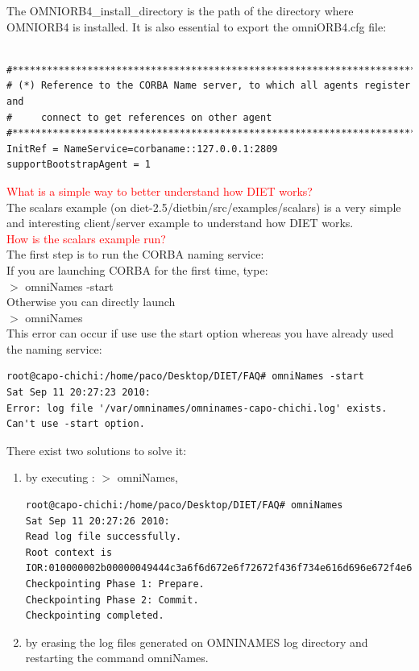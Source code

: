 \documentclass[12pt,a4paper]{book}
\newcommand{\dietversion}{2.5}
\begin{document}
\noindent The OMNIORB4\_install\_directory is the path of the directory where OMNIORB4 is installed. It is also essential to export the omniORB4.cfg file:\\


\begin{verbatim}

#****************************************************************************#
# (*) Reference to the CORBA Name server, to which all agents register and
#     connect to get references on other agent
#****************************************************************************#
InitRef = NameService=corbaname::127.0.0.1:2809
supportBootstrapAgent = 1
\end{verbatim}

\noindent \textcolor{red}{What is a simple way to better understand how DIET works?}\\
The scalars example (on diet-\dietversion/dietbin/src/examples/scalars) is a very simple and interesting client/server example to understand how DIET works.\\

\noindent \textcolor{red}{How is the scalars example run?}\\
The first step is to run the CORBA naming service:\\
If you are launching CORBA for the first time, type:\\
$>$ omniNames -start\\
Otherwise you can directly launch\\
$>$ omniNames\\

\noindent This error can occur if use use the start option whereas you have already used the naming service:
\begin{verbatim}
root@capo-chichi:/home/paco/Desktop/DIET/FAQ# omniNames -start
Sat Sep 11 20:27:23 2010:
Error: log file '/var/omninames/omninames-capo-chichi.log' exists.  Can't use -start option.
\end{verbatim}

\noindent There exist two solutions to solve it:
\begin{enumerate}
 \item by executing : $>$ omniNames,

\begin{verbatim}
root@capo-chichi:/home/paco/Desktop/DIET/FAQ# omniNames
Sat Sep 11 20:27:26 2010:
Read log file successfully.
Root context is IOR:010000002b00000049444c3a6f6d672e6f72672f436f734e616d696e672f4e616d696e67436f6e746578744578743a312e300000010000000000000070000000010102000e0000003139322e3136382e312e31303400f90a0b0000004e616d6553657276696365000300000000000000080000000100000000545441010000001c000000010000000100010001000000010001050901010001000000090101000354544108000000ccf6844c010037fa
Checkpointing Phase 1: Prepare.
Checkpointing Phase 2: Commit.
Checkpointing completed.
\end{verbatim}

 \item by erasing the log files generated on OMNINAMES log directory and restarting the command omniNames.
\end{enumerate}
\end{document}
